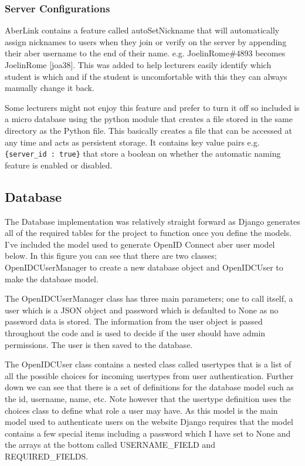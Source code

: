 \subsubsection{Server Configurations}
AberLink contains a feature called autoSetNickname that will automatically assign nicknames to users when they join or verify on the server by appending their aber username to the end of their name. e.g. JoelinRome\#4893 becomes JoelinRome [joa38]. This was added to help lecturers easily identify which student is which and if the student is uncomfortable with this they can always manually change it back. 

Some lecturers might not enjoy this feature and prefer to turn it off so included is a micro database using the python module \cite{shelve} that creates a file stored in the same directory as the Python file. This basically creates a file that can be accessed at any time and acts as persistent storage. It contains key value pairs e.g. \verb|{server_id : true}| that store a boolean on whether the automatic naming feature is enabled or disabled. 

\subsection{Database}\label{sec3:database}
The Database implementation was relatively straight forward as Django \cite{Django} generates all of the required tables for the project to function once you define the models. I've included the model used to generate OpenID Connect \cite{OpenID} aber user model below. In this figure you can see that there are two classes; OpenIDCUserManager to create a new database object and OpenIDCUser to make the database model. 

The OpenIDCUserManager class has three main parameters; one to call itself, a user which is a JSON object and password which is defaulted to None as no password data is stored. The information from the user object is passed throughout the code and is used to decide if the user should have admin permissions. The user is then saved to the database.

The OpenIDCUser class contains a nested class called usertypes that is a list of all the possible choices for incoming usertypes from user authentication. Further down we can see that there is a set of definitions for the database model such as the id, username, name, etc. Note however that the usertype definition uses the choices class to define what role a user may have. As this model is the main model used to authenticate users on the website Django requires that the model contains a few special items including a password which I have set to None and the arrays at the bottom called USERNAME\_FIELD and REQUIRED\_FIELDS.

